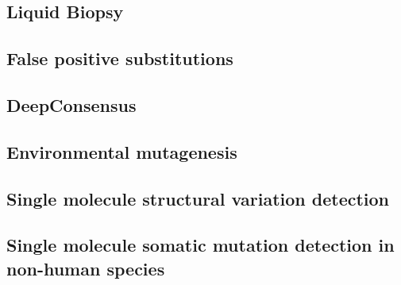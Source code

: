\subsection{Liquid Biopsy}
\subsection{False positive substitutions}
\subsection{DeepConsensus}
\subsection{Environmental mutagenesis}
\subsection{Single molecule structural variation detection}
\subsection{Single molecule somatic mutation detection in non-human species}


